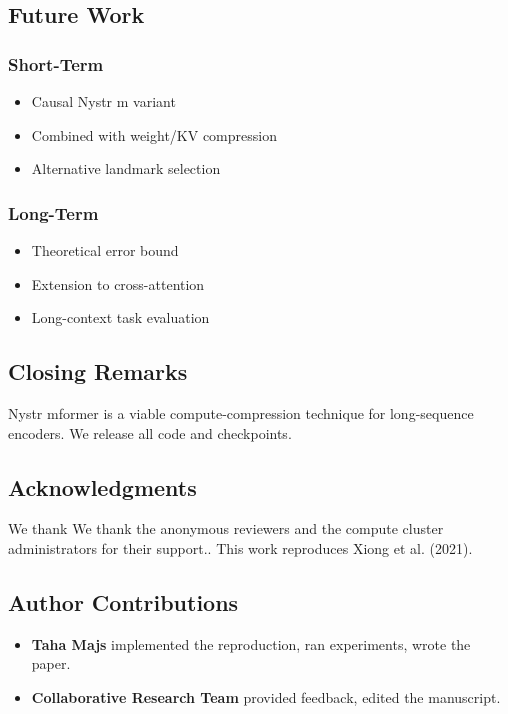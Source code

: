 \subsection{Future Work}

\subsubsection{Short-Term}
\begin{itemize}
\item Causal Nystr m variant
\item Combined with weight/KV compression
\item Alternative landmark selection

\end{itemize}
\subsubsection{Long-Term}
\begin{itemize}
\item Theoretical error bound
\item Extension to cross-attention
\item Long-context task evaluation

\end{itemize}
\subsection{Closing Remarks}

Nystr mformer is a viable compute-compression technique for long-sequence 
encoders. We release all code and checkpoints.

\subsection{Acknowledgments}

We thank We thank the anonymous reviewers and the compute cluster administrators for their support.. This work reproduces Xiong et al. (2021).

\subsection{Author Contributions}

\begin{itemize}
\item \textbf{Taha Majs} implemented the reproduction, ran experiments, wrote
  the paper.
\item \textbf{Collaborative Research Team} provided feedback, edited the manuscript.

\end{itemize}
